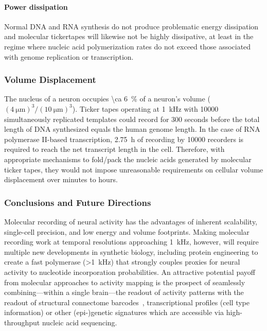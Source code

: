 \paragraph{Power dissipation}
Normal DNA and RNA synthesis do not produce problematic energy dissipation and molecular tickertapes will likewise not be highly dissipative, at least in the regime where nucleic acid polymerization rates do not exceed those associated with genome replication or transcription.

\subsubsection{Volume Displacement}

The nucleus of a neuron occupies \SI{\ca 6}{\percent} of a neuron's volume ($(\SI{4}{\um})^3/(\SI{10}{\um})^3$).
Ticker tapes operating at \SI{1}{\kHz} with \num{10000} simultaneously replicated templates could record for \num{300} seconds before the total length of DNA synthesized equals the human genome length.
In the case of RNA polymerase II-based transcription, \SI{2.75}{\hour} of recording by \num{10000} recorders is required to reach the net transcript length in the cell.
Therefore, with appropriate mechanisms to fold/pack the nucleic acids generated by molecular ticker tapes, they would not impose unreasonable requirements on cellular volume displacement over minutes to hours.

\subsubsection{Conclusions and Future Directions}

Molecular recording of neural activity has the advantages of inherent scalability, single-cell precision, and low energy and volume footprints.
Making molecular recording work at temporal resolutions approaching \SI{1}{\kHz}, however, will require multiple new developments in synthetic biology, including protein engineering to create a fast polymerase (\SI{>1}{\kHz}) that strongly couples proxies for neural activity to nucleotide incorporation probabilities.
An attractive potential payoff from molecular approaches to activity mapping is the prospect of seamlessly combining---within a single brain---the readout of activity patterns with the readout of structural connectome barcodes~\cite{zador12}, transcriptional profiles (cell type information) or other (epi-)genetic signatures which are accessible via high-throughput nucleic acid sequencing.

